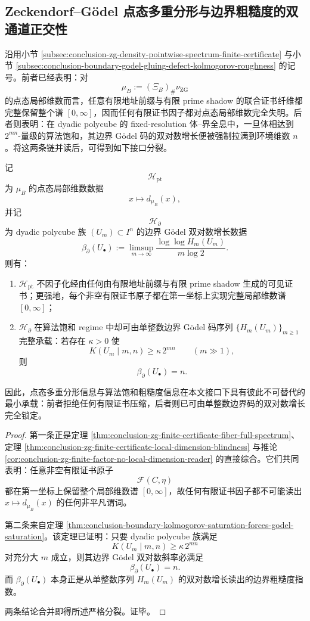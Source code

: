 \subsection{Zeckendorf--Gödel 点态多重分形与边界粗糙度的双通道正交性}\label{subsec:conclusion-zg-pointwise-boundary-twochannel-orthogonality}
沿用小节 \ref{subsec:conclusion-zg-density-pointwise-spectrum-finite-certificate} 与小节 \ref{subsec:conclusion-boundary-godel-gluing-defect-kolmogorov-roughness} 的记号。前者已经表明：对
\[
\mu_B:=(\Xi_B)_\#\nu_{\mathrm{ZG}}
\]
的点态局部维数而言，任意有限地址前缀与有限 prime shadow 的联合证书纤维都完整保留整个谱 \([0,\infty]\)，因而任何有限证书因子都对点态局部维数完全失明。后者则表明：在 dyadic polycube 的 fixed-resolution 体--界全息中，一旦体相达到 \(2^{mn}\)-量级的算法饱和，其边界 Gödel 码的双对数增长便被强制拉满到环境维数 \(n\)。将这两条链并读后，可得到如下接口分裂。

\begin{theorem}[点态多重分形通道与边界粗糙度通道的严格分裂]\label{thm:conclusion-zg-pointwise-boundary-twochannel-orthogonality}
记
\[
\mathcal H_{\mathrm{pt}}
\]
为 \(\mu_B\) 的点态局部维数数据
\[
x\longmapsto d_{\mu_B}(x),
\]
并记
\[
\mathcal H_{\partial}
\]
为 dyadic polycube 族 \((U_m)\subset I^n\) 的边界 Gödel 双对数增长数据
\[
\beta_{\partial}(U_\bullet)
:=
\limsup_{m\to\infty}\frac{\log\log H_m(U_m)}{m\log 2}.
\]
则有：
\begin{enumerate}
  \item \(\mathcal H_{\mathrm{pt}}\) 不因子化经由任何由有限地址前缀与有限 prime shadow 生成的可见证书；更强地，每个非空有限证书原子都在第一坐标上实现完整局部维数谱 \([0,\infty]\)；
  \item \(\mathcal H_{\partial}\) 在算法饱和 regime 中却可由单整数边界 Gödel 码序列 \(\{H_m(U_m)\}_{m\ge 1}\) 完整承载：若存在 \(\kappa>0\) 使
  \[
  K(U_m\mid m,n)\ge \kappa\,2^{mn}
  \qquad (m\gg 1),
  \]
  则
  \[
  \beta_{\partial}(U_\bullet)=n.
  \]
\end{enumerate}
因此，点态多重分形信息与算法饱和粗糙度信息在本文接口下具有彼此不可替代的最小承载：前者拒绝任何有限证书压缩，后者则已可由单整数边界码的双对数增长完全锁定。
\end{theorem}
\begin{proof}
第一条正是定理 \ref{thm:conclusion-zg-finite-certificate-fiber-full-spectrum}、定理 \ref{thm:conclusion-zg-finite-certificate-local-dimension-blindness} 与推论 \ref{cor:conclusion-zg-finite-factor-no-local-dimension-reader} 的直接综合。它们共同表明：任意非空有限证书原子
\[
\mathcal F(C,\eta)
\]
都在第一坐标上保留整个局部维数谱 \([0,\infty]\)，故任何有限证书因子都不可能读出 \(x\mapsto d_{\mu_B}(x)\) 的任何非平凡谓词。

第二条来自定理 \ref{thm:conclusion-boundary-kolmogorov-saturation-forces-godel-saturation}。该定理已证明：只要 dyadic polycube 族满足
\[
K(U_m\mid m,n)\ge \kappa\,2^{mn}
\]
对充分大 \(m\) 成立，则其边界 Gödel 双对数斜率必满足
\[
\beta_{\partial}(U_\bullet)=n.
\]
而 \(\beta_{\partial}(U_\bullet)\) 本身正是从单整数序列 \(H_m(U_m)\) 的双对数增长读出的边界粗糙度指数。

两条结论合并即得所述严格分裂。证毕。
\end{proof}

